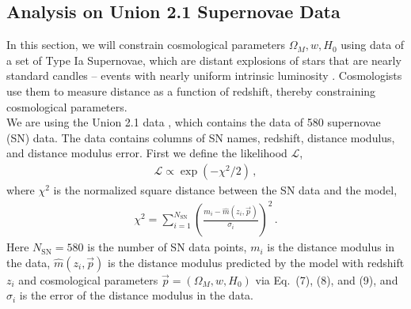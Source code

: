 \documentclass[11pt]{article}
\theoremstyle{break}
\theoremstyle{break}
\begin{document}
\subsection{Analysis on Union 2.1 Supernovae Data}
${}$\qquad In this section, we will constrain cosmological parameters $\Omega_M, w, H_0$ using data of a set of Type Ia Supernovae, which are distant explosions of stars that are nearly standard candles – events with nearly uniform intrinsic luminosity \cite{U21}. Cosmologists use them to measure distance as a function of redshift, thereby constraining cosmological parameters.\\

${}$\qquad We are using the Union 2.1 data \cite{U21}, which contains the data of 580 supernovae (SN) data. The data contains columns of SN names, redshift, distance modulus, and distance modulus error. First we define the likelihood $\mathcal{L}$,
\begin{align}
\mathcal{L} \propto \exp\left( -\chi^2/2\right)\,,
\end{align}
where $\chi^2$ is the normalized square distance between the SN data and the model, 
\begin{align*}
\chi^2 = \sum_{i=1}^{N_{\text{SN}}} \left( \frac{m_i - \hat{m}(z_i,\vec{p})}{\sigma_i} \right)^2\,.
\end{align*}
Here $N_{\text{SN}}=580$ is the number of SN data points, $m_i$ is the distance modulus in the data, $\hat{m}(z_i,\vec{p})$ is the distance modulus predicted by the model with redshift $z_i$ and cosmological parameters $\vec{p} = (\Omega_M, w, H_0)$ via Eq.\ (7), (8), and (9), and $\sigma_i$ is the error of the distance modulus in the data. \\
\end{document}
